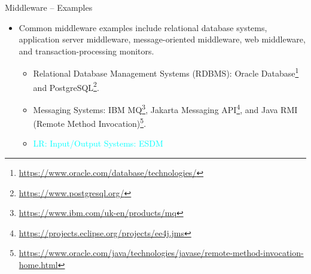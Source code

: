 \documentclass[compress,11pt,xcolor=svgnames,aspectratio=169]{beamer}
\newcommand{\lr}[1]{\textcolor{cyan}{LR: #1}}
\begin{document}
\begin{frame}[fragile]{Middleware -- Examples}

\begin{itemize}
\setlength\itemsep{0.6cm}

\item Common middleware examples include relational database systems, application server middleware, message-oriented middleware, web middleware, and transaction-processing monitors.

  \begin{itemize}
  \setlength\itemsep{0.4cm}

  \item Relational Database Management Systems (RDBMS): Oracle Database\footnote{\tiny \url{https://www.oracle.com/database/technologies/}} and PostgreSQL\footnote{\tiny \url{https://www.postgresql.org/}}.

  \item Messaging Systems: IBM MQ\footnote{\tiny \url{https://www.ibm.com/uk-en/products/mq}}, Jakarta Messaging API\footnote{\tiny \url{https://projects.eclipse.org/projects/ee4j.jms}}, and Java RMI (Remote Method Invocation)\footnote{\tiny \url{https://www.oracle.com/java/technologies/javase/remote-method-invocation-home.html}}.

  \item \lr{Input/Output Systems: ESDM}

  \end{itemize}

\end{itemize}

\nocite{hailperin2006operating}

\end{frame}
\end{document}
